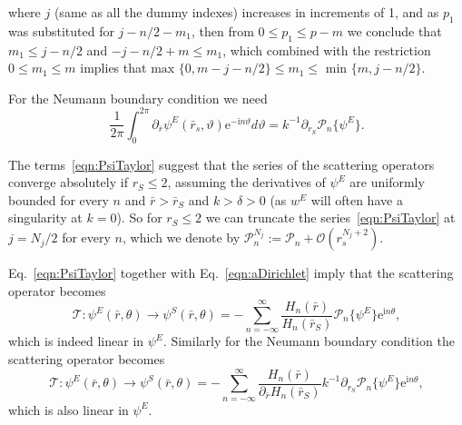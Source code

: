 \documentclass[ 12pt, a4paper]{article}
\newcommand{\be}{\begin{equation}}
\newcommand{\en}{\end{equation}}
\def\bga#1\ega{\begin{gather}#1\end{gather}} %
\DeclareMathOperator{\sign}{sgn}
\newcommand{\T}{\mathscr T}
\newcommand{\ii}{\textrm{i}}
\newcommand{\ee}{\textrm{e}}
\begin{document}
where $j$ (same as all the dummy indexes) increases in increments of 1, and as $p_1$ was substituted for $j -n/2- m_1$, then from $0\leq p_1 \leq p-m $ we conclude that $m_1 \leq  j -n/2 $ and $-j -n/2 +m \leq m_1$, which combined with the restriction $0 \leq m_1 \leq m$ implies that $ \text{max } \{0,  m -j -n/2 \}\leq m_1 \leq \text{ min } \{m, j -n/2\}$.

For the Neumann boundary condition we need
\be
\frac{1}{2 \pi}\int_{0}^{2 \pi} \partial_{\bar r}\psi^E(\bar r_s, \vartheta)\ee^{- \ii n \vartheta} d \vartheta = k^{-1} \partial_{r_S}\mathcal P_n\{\psi^E \}.
\label{eqn:DPsiTaylor}
\en

The terms~\eqref{eqn:PsiTaylor} suggest that the series of the scattering operators converge absolutely if $r_S \leq 2$, assuming the derivatives of $\psi^E$
are uniformly bounded for every $n$ and $\bar r> \bar r_S$ and $k> \delta>0$ (as $w^E$ will often have a singularity at $k=0$). So for $r_S \leq 2$ we can truncate the series~\eqref{eqn:PsiTaylor} at $j = N_j/2$ for every $n$, which we denote by $\mathcal P_n^{N_j} := \mathcal P_n + \mathcal O(r_s^{N_j +2}) $.

Eq.~\eqref{eqn:PsiTaylor} together with Eq.~\eqref{eqn:aDirichlet} imply that the scattering operator becomes
\be
\T :  \psi^E( \bar r, \theta) \to \psi^S(\bar r, \theta) =  - \sum_{n = -\infty}^\infty\frac{H_n(\bar r)}{ H_n(\bar r_S)} \mathcal P_n\{ \psi^E \} \ee^{\ii n \theta} ,
\label{eqn:ScatteringOpDirichlet}
\en
which is indeed linear in $\psi^E$. Similarly for the Neumann boundary condition the scattering operator becomes
\be
\T : \psi^E(\bar r, \theta) \to \psi^S(\bar r, \theta) = - \sum_{n = -\infty}^\infty \frac{H_n(\bar r)}{\partial_{\bar r} H_n( \bar r_S)}  k^{-1} \partial_{r_S} \mathcal P_n\{ \psi^E  \} \ee^{\ii n \theta},
\label{eqn:ScatteringOpNeumann}
\en
which is also linear in $\psi^E$.
\end{document}

